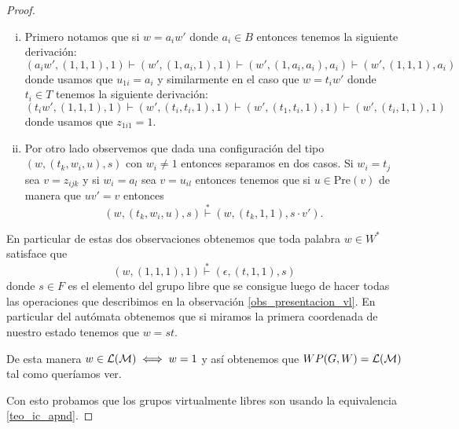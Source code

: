 \documentclass[tesis.tex]{subfiles}
\begin{document}
\begin{proof}
	\begin{enumerate}[i)]
		\item Primero notamos que si $w = a_{i}w'$ donde $a_{i} \in B$ entonces tenemos la siguiente derivación:
		\[
		(a_{i}w', ( 1,1,1), 1 ) \vdash (w', (1,a_{i},1),1) \vdash (w',(1,a_{i},a_{i}),a_{i}) \vdash (w', (1,1,1), a_{i})
		\]
		donde usamos que $u_{1i} = a_{i}$
		y similarmente en el caso que $w = t_{i}w'$ donde $t_{i} \in T$ tenemos la siguiente derivación:
		\[
		(t_{i}w', (1,1,1), 1) \vdash (w', (t_{i},t_{i},1),1) \vdash (w',(t_{1},t_{i},1),1) \vdash (w', (t_{i},1,1), 1)
		\]
		donde usamos que $z_{1i1} = 1$.
		
		\item Por otro lado observemos que dada una configuración del tipo $(w, ( t_{k}, w_{i}, u), s)$ con $w_{i} \neq 1$ entonces separamos en dos casos.
		Si $w_{i} = t_{j}$ sea $v = z_{ijk}$ y si $w_{i} = a_{l}$ sea $v = u_{il}$ entonces tenemos que si $u \in \text{Pre}(v)$ de manera que $uv' = v$ entonces
		\[
		(w, ( t_{k}, w_{i}, u), s) \overset{*}{\vdash} (w, ( t_{k}, 1, 1), s \cdot v').
		\]
	\end{enumerate}
	
	
	
	
	
	
	En particular de estas dos observaciones obtenemos que toda palabra $w \in W^*$ satisface que 
	\[
		(w, (1,1,1), 1) \overset{*}{\vdash} (\epsilon, (t, 1,1), s)
	\]
	donde $s \in F$ es el elemento del grupo libre que se consigue luego de hacer todas las operaciones que describimos en la observación \ref{obs_presentacion_vl}. 
	En particular del autómata obtenemos que si miramos la primera coordenada de nuestro estado tenemos que $w = st$.
	
	De esta manera $w \in {\cal L(M)} \iff w = 1 $ y así obtenemos que $WP(G,W) = \cal L(M)$ tal como queríamos ver.
	
	
	
	Con esto probamos que los grupos virtualmente libres son \ic usando la equivalencia \ref{teo_ic_apnd}.
	
\end{proof}
\end{document}
